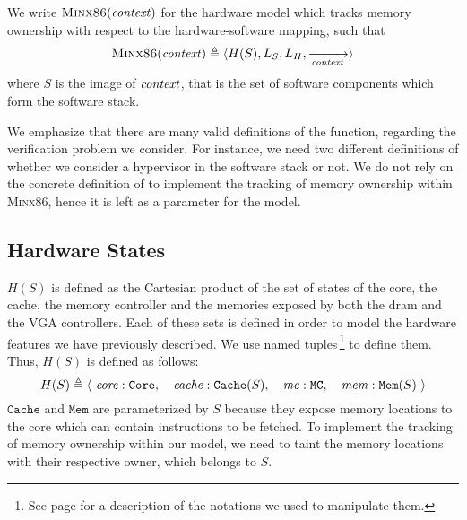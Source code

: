 \begin{definition}
  \label{def:speccert2:minx86}
  We write $\textsc{Minx86}(\mathit{context})$ for the hardware model which
  tracks memory ownership with respect to the  hardware-software
  mapping, such that
%
  \[
    \textsc{Minx86}(\mathit{context}) \triangleq \langle H(S), L_S, L_H,
    \xrightarrow[\mathit{context}]{} \rangle
  \]
  where $S$ is the image of $\mathit{context}$, that is the set of software
  components which form the software stack.
\end{definition}

We emphasize that there are many valid definitions of the 
function, regarding the verification problem we consider.
%
For instance, we need two different definitions of  whether we
consider a hypervisor in the software stack or not.
%
We do not rely on the concrete definition of  to implement the
tracking of memory ownership within {\scshape Minx86}, hence it is left as a
parameter for the model.

\subsection{Hardware States}
\label{subsec:speccert2:state}

$H(S)$ is defined as the Cartesian product of the set of states of the core, the
cache, the memory controller and the memories exposed by both the \ac{dram} and
the VGA controllers.
%
Each of these sets is defined in order to model the hardware features we have
previously described.
%
We use named tuples\,\footnote{See page \pageref{frontmatter:notations} for a
  description of the notations we used to manipulate them.} to define them.
%
Thus, $H(S)$ is defined as follows:
%
\[
  H(S) \triangleq \left<\ \mathit{core}: \mathtt{Core},\quad\mathit{cache}:
    \mathtt{Cache}(S),\quad\mathit{mc}: \mathtt{MC},\quad\mathit{mem}:
    \mathtt{Mem}(S) \ \right>
\]
%
\( \mathtt{Cache} \) and \( \mathtt{Mem} \) are parameterized by \( S \) because
they expose memory locations to the core which can contain instructions to be
fetched. To implement the tracking of memory ownership within our model, we need
to taint the memory locations with their respective owner, which belongs to
\( S \).

